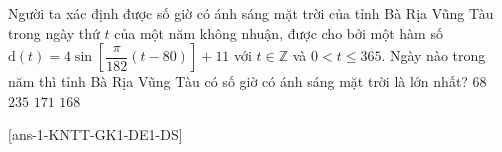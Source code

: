	\begin{ex}%
	Người ta xác định được số giờ có ánh sáng mặt trời của tỉnh Bà Rịa Vũng Tàu trong ngày thứ $t$ của một năm không nhuận, được cho bởi một hàm số $\mathrm{d}(t)=4\sin \left[\dfrac{\pi}{182}(t-80)\right]+11$ với $t \in \mathbb{Z}$ và $0< t \leq 365$. Ngày nào trong năm thì tỉnh Bà Rịa Vũng Tàu có số giờ có ánh sáng mặt trời là lớn nhất?
	\choice
	{$68$}
	{$235$}
	{\True $171$}
	{$168$}
	\end{ex}


\cauds

[ans-1-KNTT-GK1-DE1-DS]

